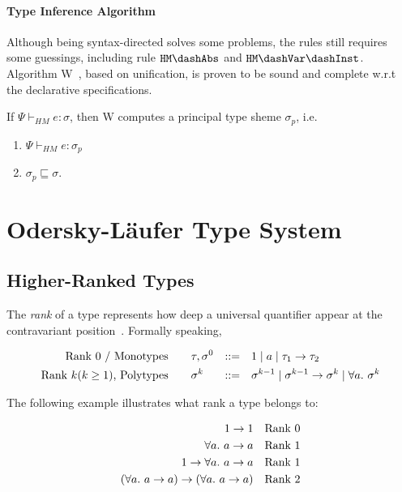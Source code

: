 \paragraph{Type Inference Algorithm}
Although being syntax-directed solves some problems, the rules still requires some guessings,
including rule $\mathtt{HM \dash Abs}$ and $\mathtt{HM \dash Var \dash Inst}$.
Algorithm W~\cite{milner1978theory}, based on unification,
is proven to be sound and complete w.r.t the declarative specifications.

\begin{theorem}
    If $\Psi \vdash_{HM} e : \sigma$, then W computes a principal type sheme $\sigma_p$, i.e.
    \begin{enumerate}
        \item $\Psi \vdash_{HM} e : \sigma_p$
        \item $\sigma_p \sqsubseteq \sigma$.
    \end{enumerate}
\end{theorem}

\section{Odersky-L\"aufer Type System}\label{sec:bg:ol}


\subsection{Higher-Ranked Types}

The \emph{rank} of a type represents how deep a universal quantifier
appear at the contravariant position~\cite{rank1992kfoury}. Formally speaking,

\begin{gather*}
    \begin{aligned}
        \text{Rank 0 / Monotypes}\qquad& \tau, \sigma^0 &::=&\quad 1 \mid a \mid \tau_1\to \tau_2\\
        \text{Rank $k (k \ge 1)$, Polytypes}\qquad& \sigma^k &::=&\quad
            \sigma^{k-1} \mid \sigma^{k-1} \to \sigma^k \mid \all \sigma^k\\
    \end{aligned}
\end{gather*}

The following example illustrates what rank a type belongs to:

\begin{gather*}
    \begin{aligned}
        1 \to 1 && \text{Rank 0}\\
        \all a \to a && \text{Rank 1}\\
        1 \to \all a \to a && \text{Rank 1}\\
        (\all a \to a) \to (\all a \to a) && \text{Rank 2}\\
    \end{aligned}
\end{gather*}

